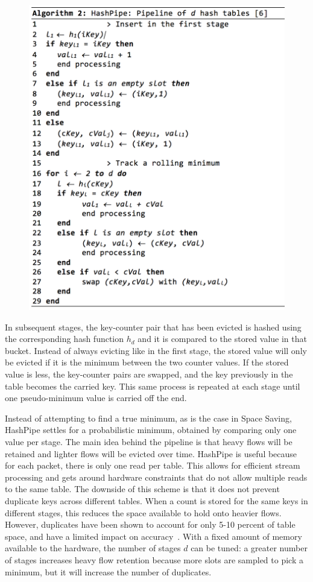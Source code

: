 \begin{figure}[t]
  \centering
    \includegraphics[scale=0.42]{alg2}
     \label{fig:bp-image}
\end{figure}
In subsequent stages, the key-counter pair that has been evicted is hashed using the corresponding hash function $h_d$ and it is compared to the stored value in that bucket. Instead of always evicting like in the first stage, the stored value will only be evicted if it is the minimum between the two counter values. If the stored value is less, the key-counter pairs are swapped, and the key previously in the table becomes the carried key. This same process is repeated at each stage until one pseudo-minimum value is carried off the end.

Instead of attempting to find a true minimum, as is the case in Space Saving, HashPipe settles for a probabilistic minimum, obtained by comparing only one value per stage. The main idea behind the pipeline is that heavy flows will be retained and lighter flows will be evicted over time. HashPipe is useful because for each packet, there is only one read per table. This allows for efficient stream processing and gets around hardware constraints that do not allow multiple reads to the same table. The downside of this scheme is that it does not prevent duplicate keys across different tables. When a count is stored for the same keys in different stages, this reduces the space available to hold onto heavier flows. However, duplicates have been shown to account for only 5-10 percent of table space, and have a limited impact on accuracy~\cite{hashpipe}. With a fixed amount of memory available to the hardware, the number of stages $d$ can be tuned: a greater number of stages increases heavy flow retention because more slots are sampled to pick a minimum, but it will increase the number of duplicates.